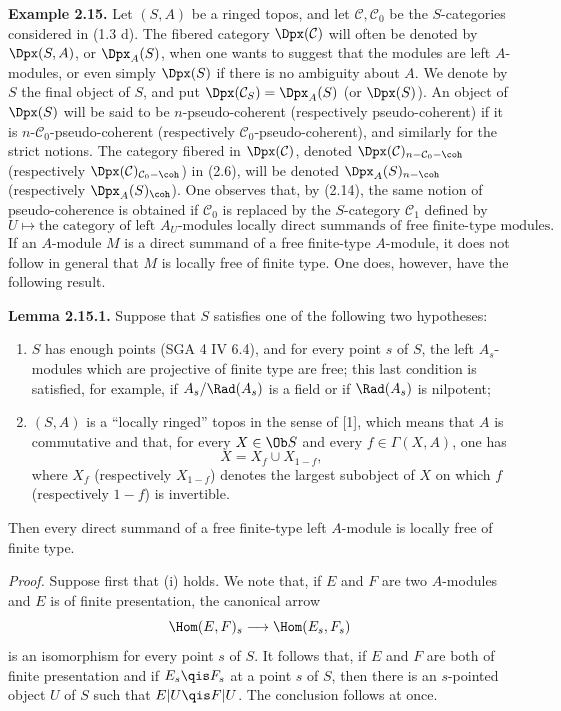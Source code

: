 \textbf{Example 2.15.} Let \((S,A)\) be a ringed topos, and let \(\mathcal C,\mathcal C_0\) be the \(S\)-categories considered in (1.3 d). The fibered category \(\Dpx(\mathcal C)\) will often be denoted by \(\Dpx(S,A)\), or \(\Dpx_A(S)\), when one wants to suggest that the modules are left \(A\)-modules, or even simply \(\Dpx(S)\) if there is no ambiguity about \(A\). We denote by \(S\) the final object of \(S\), and put \(\Dpx(\mathcal C_S)=\Dpx_A(S)\) (or \(\Dpx(S)\)). An object of \(\Dpx(S)\) will be said to be \(n\)-pseudo-coherent (respectively pseudo-coherent) if it is \(n\)-\(\mathcal C_0\)-pseudo-coherent (respectively \(\mathcal C_0\)-pseudo-coherent), and similarly for the strict notions. The category fibered in \(\Dpx(\mathcal C)\), denoted \(\Dpx(\mathcal C)_{n-\mathcal C_0-\coh}\) (respectively \(\Dpx(\mathcal C)_{\mathcal C_0-\coh}\)) in (2.6), will be denoted \(\Dpx_A(S)_{n-\coh}\) (respectively \(\Dpx_A(S)_{\coh}\)). One observes that, by (2.14), the same notion of pseudo-coherence is obtained if \(\mathcal C_0\) is replaced by the \(S\)-category \(\mathcal C_1\) defined by
\[
  U\longmapsto \text{the category of left }A_U\text{-modules locally direct summands of free finite-type modules}.
\]
If an \(A\)-module \(M\) is a direct summand of a free finite-type \(A\)-module, it does not follow in general that \(M\) is locally free of finite type. One does, however, have the following result.

\textbf{Lemma 2.15.1.} Suppose that \(S\) satisfies one of the following two hypotheses:
\begin{enumerate}[label=(\roman*)]
\item \(S\) has enough points (SGA 4 IV 6.4), and for every point \(s\) of \(S\), the left \(A_s\)-modules which are projective of finite type are free; this last condition is satisfied, for example, if \(A_s/\Rad(A_s)\) is a field or if \(\Rad(A_s)\) is nilpotent;
\item \((S,A)\) is a ``locally ringed'' topos in the sense of [1], which means that \(A\) is commutative and that, for every \(X\in\Ob S\) and every \(f\in\Gamma(X,A)\), one has
\[
  X=X_f\cup X_{1-f},
\]
where \(X_f\) (respectively \(X_{1-f}\)) denotes the largest subobject of \(X\) on which \(f\) (respectively \(1-f\)) is invertible.
\end{enumerate}
Then every direct summand of a free finite-type left \(A\)-module is locally free of finite type.

\emph{Proof.} Suppose first that (i) holds. We note that, if \(E\) and \(F\) are two \(A\)-modules and \(E\) is of finite presentation, the canonical arrow
\[
  \Hom(E,F)_s\longrightarrow \Hom(E_s,F_s)
\]
is an isomorphism for every point \(s\) of \(S\). It follows that, if \(E\) and \(F\) are both of finite presentation and if \(E_s\qis F_s\) at a point \(s\) of \(S\), then there is an \(s\)-pointed object \(U\) of \(S\) such that \(E|U\qis F|U\). The conclusion follows at once.

